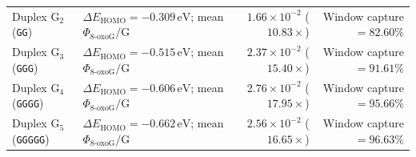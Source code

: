 \documentclass[10pt,letterpaper]{article}
\theoremstyle{plain}
\theoremstyle{definition}
\newcommand{\oxog}{\text{8-oxoG}}
\begin{document}
\begin{table}[!t]
{\begin{tabular}{@{}llrr@{}}
Duplex $\mathrm{G}_2$ (\texttt{GG}) & $\Delta E_{\mathrm{HOMO}} = -0.309\,\mathrm{eV}$; mean $\Phi_{\oxog}/\mathrm{G}$ & $1.66 \times 10^{-2}$ ($10.83\times$) & Window capture $= 82.60\%$ \\
Duplex $\mathrm{G}_3$ (\texttt{GGG}) & $\Delta E_{\mathrm{HOMO}} = -0.515\,\mathrm{eV}$; mean $\Phi_{\oxog}/\mathrm{G}$ & $2.37 \times 10^{-2}$ ($15.40\times$) & Window capture $= 91.61\%$ \\
Duplex $\mathrm{G}_4$ (\texttt{GGGG}) & $\Delta E_{\mathrm{HOMO}} = -0.606\,\mathrm{eV}$; mean $\Phi_{\oxog}/\mathrm{G}$ & $2.76 \times 10^{-2}$ ($17.95\times$) & Window capture $= 95.66\%$ \\
Duplex $\mathrm{G}_5$ (\texttt{GGGGG}) & $\Delta E_{\mathrm{HOMO}} = -0.662\,\mathrm{eV}$; mean $\Phi_{\oxog}/\mathrm{G}$ & $2.56 \times 10^{-2}$ ($16.65\times$) & Window capture $= 96.63\%$ \\
\bottomrule
\end{tabular}%
}
\end{table}
\end{document}
